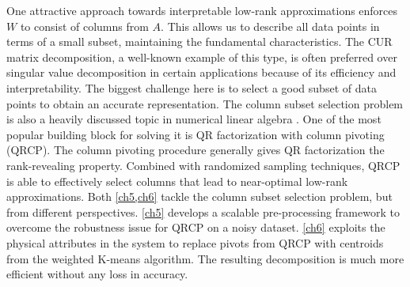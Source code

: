 One attractive approach towards interpretable low\hyp{}rank approximations
enforces $W$ to consist of columns from $A$. This allows us to describe all data
points in terms of a small subset, maintaining the fundamental characteristics.
The CUR matrix decomposition, a well\hyp{}known example of this type, is often
preferred over singular value decomposition in certain applications because of
its efficiency and interpretability. The biggest challenge here is to select a
good subset of data points to obtain an accurate representation. The column
subset selection problem is also a heavily discussed topic in numerical linear
algebra \cite{boutsidis2009improved,deshpande2010efficient}. One of the most
popular building block for solving it is QR factorization with column pivoting 
(QRCP). The column pivoting procedure generally gives QR factorization the 
rank\hyp{}revealing property. Combined with randomized sampling techniques, QRCP
is able to effectively select columns that lead to near\hyp{}optimal 
low\hyp{}rank approximations. Both \cref{ch5,ch6} tackle the column subset
selection problem, but from different perspectives. \cref{ch5} develops a
scalable pre\hyp{}processing framework to overcome the robustness issue for
QRCP on a noisy dataset. \cref{ch6} exploits the physical attributes in the
system to replace pivots from QRCP with centroids from the weighted K\hyp{}means
algorithm. The resulting decomposition is much more efficient without any loss
in accuracy.